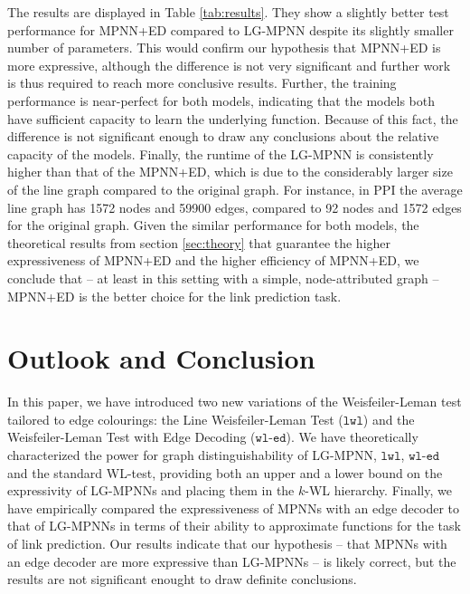 \documentclass{article}
\newcommand{\wledge}{\texttt{wl-ed}}
\newcommand{\lwl}{\texttt{lwl}}
\begin{document}
The results are displayed in Table \ref{tab:results}. They show a slightly better test performance for MPNN+ED compared to LG-MPNN despite its slightly smaller number of parameters. This would confirm our hypothesis that MPNN+ED is more expressive, although the difference is not very significant and further work is thus required to reach more conclusive results.
Further, the training performance is near-perfect for both models, indicating that the models both have sufficient capacity to learn the underlying function. Because of this fact, the difference is not significant enough to draw any conclusions about the relative capacity of the models.
Finally, the runtime of the LG-MPNN is consistently higher than that of the MPNN+ED, which is due to the considerably larger size of the line graph compared to the original graph. For instance, in PPI the average line graph has 1572 nodes and 59900 edges, compared to 92 nodes and 1572 edges for the original graph.
Given the similar performance for both models, the theoretical results from section \ref{sec:theory} that guarantee the higher expressiveness of MPNN+ED and the higher efficiency of MPNN+ED, we conclude that -- at least in this setting with a simple, node-attributed graph -- MPNN+ED is the better choice for the link prediction task.


\section{Outlook and Conclusion}



In this paper, we have introduced two new variations of the Weisfeiler-Leman test tailored to edge colourings: the Line Weisfeiler-Leman Test ($\lwl$) and the Weisfeiler-Leman Test with Edge Decoding ($\wledge$).
We have theoretically characterized the power for graph distinguishability of LG-MPNN, $\lwl$, $\wledge$ and the standard WL-test, providing both an upper and a lower bound on the expressivity of LG-MPNNs and placing them in the $k$-WL hierarchy.
%
Finally, we have empirically compared the expressiveness of MPNNs with an edge decoder to that of LG-MPNNs in terms of their ability to approximate functions for the task of link prediction. Our results indicate that our hypothesis -- that MPNNs with an edge decoder are more expressive than LG-MPNNs -- is likely correct, but the results are not significant enought to draw definite conclusions.
\end{document}
